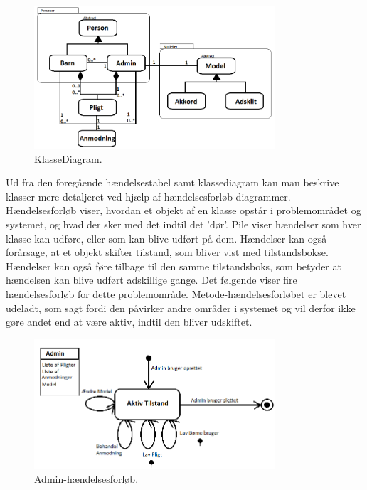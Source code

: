 \begin{figure}[H]
\centering
\includegraphics[width=0.8\textwidth]{Billeder/KlasseDiagram.png}
\caption{KlasseDiagram.}
\label{KlasseDiagram}
\end{figure}

Ud fra den foregående hændelsestabel samt klassediagram kan man beskrive klasser mere detaljeret ved hjælp af hændelsesforløb-diagrammer. Hændelsesforløb viser, hvordan et objekt af en klasse opstår i problemområdet og systemet, og hvad der sker med det indtil det ’dør’. Pile viser hændelser som hver klasse kan udføre, eller som kan blive udført på dem. Hændelser kan også forårsage, at et objekt skifter tilstand, som bliver vist med tilstandsbokse. Hændelser kan også føre tilbage til den samme tilstandsboks, som betyder at hændelsen kan blive udført adskillige gange. Det følgende viser fire hændelsesforløb for dette problemområde. Metode-hændelsesforløbet er blevet udeladt, som sagt fordi den påvirker andre områder i systemet og vil derfor ikke gøre andet end at være aktiv, indtil den bliver udskiftet.

\begin{figure}[H]
\centering
\includegraphics[width=0.8\textwidth]{Billeder/ForaelderForloeb.png}
\caption{Admin-hændelsesforløb.}
\label{ForaelderHaendelsesforloeb}
\end{figure}

